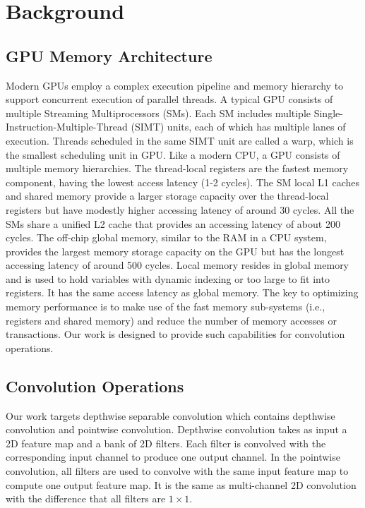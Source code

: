 
\section{Background}
\subsection{GPU Memory Architecture}
Modern GPUs employ a complex execution pipeline and memory hierarchy to support concurrent execution of parallel threads. 
A typical GPU consists of multiple Streaming Multiprocessors (SMs). 
Each SM includes multiple Single-Instruction-Multiple-Thread (SIMT) units, each of which has multiple lanes of execution. 
Threads scheduled in the same SIMT unit are called a warp, which is the smallest scheduling unit in GPU. 
Like a modern CPU, a GPU consists of multiple memory hierarchies. 
The thread-local registers are the fastest memory component, having the lowest access latency (1-2 cycles). 
The SM local L1 caches and shared memory provide a larger storage capacity over the thread-local registers but have modestly higher accessing latency of around 30 cycles. 
All the SMs share a unified L2 cache that provides an accessing latency of about 200 cycles. 
The off-chip global memory, similar to the RAM in a CPU system, provides the largest memory storage capacity on the GPU but has the longest accessing latency of around 500 cycles. 
Local memory resides in global memory and is used to hold variables with dynamic indexing or too large to fit into registers. 
It has the same access latency as global memory. 
The key to optimizing memory performance is to make use of the fast memory sub-systems (i.e., registers and shared memory) and reduce the number of memory accesses or transactions. 
Our work is designed to provide such capabilities for convolution operations.

\subsection{Convolution Operations}
Our work targets depthwise separable convolution which contains depthwise convolution and pointwise convolution. 
Depthwise convolution takes as input a 2D feature map and a bank of 2D filters. Each filter is convolved with the corresponding input channel to produce one output channel. 
In the pointwise convolution, all filters are used to convolve with the same input feature map to compute one output feature map. It is the same as multi-channel 2D convolution with the difference that all filters are $1 \times 1$.


